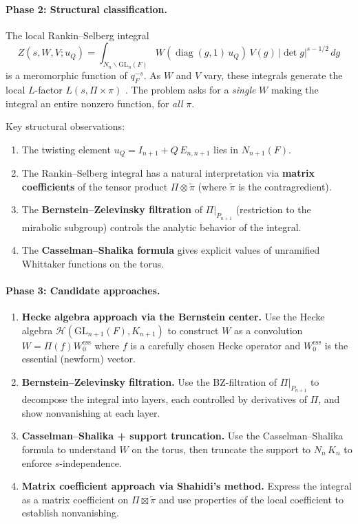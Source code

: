 \paragraph{Phase 2: Structural classification.}
The local Rankin--Selberg integral
\[
  Z(s, W, V; u_Q) = \int_{N_n \backslash \mathrm{GL}_n(F)}
  W(\operatorname{diag}(g,1)\,u_Q)\, V(g)\, |\!\det g|^{s-1/2}\, dg
\]
is a meromorphic function of $q_F^{-s}$. As $W$ and $V$ vary, these integrals
generate the local $L$-factor $L(s, \Pi \times \pi)$ \cite{JPSS83}. The
problem asks for a \emph{single} $W$ making the integral an entire nonzero
function, for \emph{all} $\pi$.

Key structural observations:
\begin{enumerate}
\item The twisting element $u_Q = I_{n+1} + Q\,E_{n,n+1}$ lies in $N_{n+1}(F)$.
\item The Rankin--Selberg integral has a natural interpretation via
  \textbf{matrix coefficients} of the tensor product $\Pi \otimes \widetilde{\pi}$
  (where $\widetilde{\pi}$ is the contragredient).
\item The \textbf{Bernstein--Zelevinsky filtration} of $\Pi|_{P_{n+1}}$
  (restriction to the mirabolic subgroup) controls the analytic behavior of
  the integral.
\item The \textbf{Casselman--Shalika formula} gives explicit values of
  unramified Whittaker functions on the torus.
\end{enumerate}

\paragraph{Phase 3: Candidate approaches.}
\begin{enumerate}
\item \textbf{Hecke algebra approach via the Bernstein center.}
  Use the Hecke algebra $\mathcal{H}(\mathrm{GL}_{n+1}(F), K_{n+1})$
  to construct $W$ as a convolution $W = \Pi(f)W_0^{\mathrm{ess}}$
  where $f$ is a carefully chosen Hecke operator and $W_0^{\mathrm{ess}}$
  is the essential (newform) vector.
\item \textbf{Bernstein--Zelevinsky filtration.}
  Use the BZ-filtration of $\Pi|_{P_{n+1}}$ to decompose the integral into
  layers, each controlled by derivatives of $\Pi$, and show nonvanishing
  at each layer.
\item \textbf{Casselman--Shalika + support truncation.}
  Use the Casselman--Shalika formula to understand $W$ on the torus,
  then truncate the support to $N_n\,K_n$ to enforce $s$-independence.
\item \textbf{Matrix coefficient approach via Shahidi's method.}
  Express the integral as a matrix coefficient on $\Pi \boxtimes \widetilde{\pi}$
  and use properties of the local coefficient to establish nonvanishing.
\end{enumerate}

